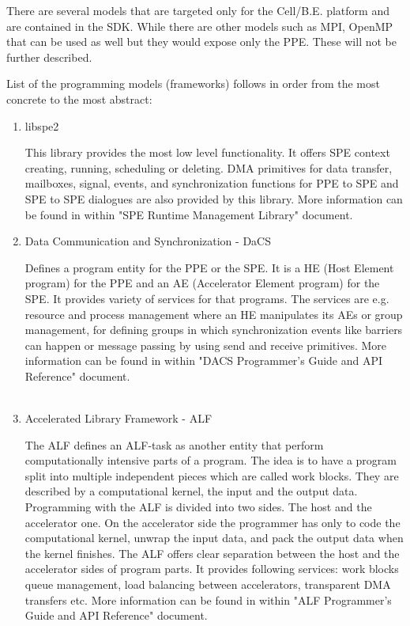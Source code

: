 \par
There are several models that are targeted only for the \mbox{Cell/B.E.} platform and are contained in the SDK.
While there are other models such as MPI, OpenMP that can be used as well but they would expose only the PPE.
These will not be further described.

List of the programming models (frameworks) follows in order from the most concrete to the most abstract:
\begin{enumerate}
\item {libspe2}
\par
This library provides the most low level functionality.
It offers SPE context creating, running, scheduling or deleting.
DMA primitives for data transfer, mailboxes, signal, events, and synchronization functions for PPE to SPE and SPE to SPE dialogues are also provided by this library.
More information can be found in \cite{performanceToolRef} within "SPE Runtime Management Library" document.

\item {Data Communication and Synchronization - DaCS}
\par
Defines a program entity for the PPE or the SPE.
It is a HE (Host Element program) for the PPE and an AE (Accelerator Element program) for the SPE.
It provides variety of services for that programs.
The services are e.g. resource and process management where an HE manipulates its AEs or group management, for defining groups in which synchronization events like barriers can happen or message passing by using send and receive primitives.
More information can be found in \cite{performanceToolRef} within "DACS Programmer's Guide and API Reference" document.\\\\

\item {Accelerated Library Framework - ALF}
\par
The ALF defines an ALF-task as another entity that perform computationally intensive parts of a program.
The idea is to have a program split into multiple independent pieces which are called work blocks.
They are described by a computational kernel, the input and the output data.
Programming with the ALF is divided into two sides.
The host and the accelerator one.
On the accelerator side the programmer has only to code the computational kernel, unwrap the input data, and pack the output data when the kernel finishes.
The ALF offers clear separation between the host and the accelerator sides of program parts.
It provides following services: work blocks queue management, load balancing between accelerators, transparent DMA transfers etc.
More information can be found in \cite{performanceToolRef} within "ALF Programmer's Guide and API Reference" document.

\end{enumerate}

